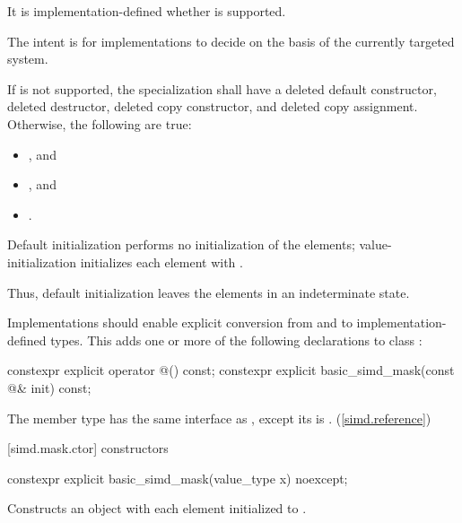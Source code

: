 It is implementation-defined whether  is supported.
\begin{note}The intent is for implementations to decide on the basis of the currently targeted system.\end{note}

If  is not supported, the specialization shall have a deleted default constructor, deleted destructor, deleted copy constructor, and deleted copy assignment.
Otherwise, the following are true:
\begin{itemize}
  \item {}, and
  \item {}, and
  \item {}.
\end{itemize}

\pnum
Default initialization performs no initialization of the elements; value-initialization initializes each element with . \begin{note}Thus, default initialization leaves the elements in an indeterminate state.\end{note}

\pnum
Implementations should enable explicit conversion from and to implementation-defined types. This adds one or more of the following declarations to class :

\begin{codeblock}
constexpr explicit operator @\impdef@() const;
constexpr explicit basic_simd_mask(const @\impdef@& init) const;
\end{codeblock}

\pnum
The member type  has the same interface as , except its  is . (\ref{simd.reference})

[simd.mask.ctor]{ constructors}

\begin{itemdecl}
constexpr explicit basic_simd_mask(value_type x) noexcept;
\end{itemdecl}

\begin{itemdescr}
  \pnum\effects
  Constructs an object with each element initialized to .
\end{itemdescr}

